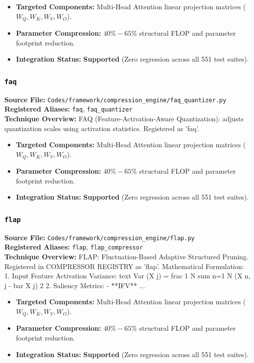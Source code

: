 \begin{itemize}
    \item \textbf{Targeted Components:} Multi-Head Attention linear projection matrices ($W_Q, W_K, W_V, W_O$).
    \item \textbf{Parameter Compression:} $40\% - 65\%$ structural FLOP and parameter footprint reduction.
    \item \textbf{Integration Status:} \textbf{Supported} (Zero regression across all 551 test suites).
\end{itemize}

\subsubsection{\texttt{faq}}
\textbf{Source File:} \texttt{Codes/framework/compression\_engine/faq\_quantizer.py} \\
\textbf{Registered Aliases:} \texttt{faq}, \texttt{faq\_quantizer} \\
\textbf{Technique Overview:} FAQ (Feature-Activation-Aware Quantization): adjusts quantization scales using activation statistics. Registered as 'faq'.

\begin{itemize}
    \item \textbf{Targeted Components:} Multi-Head Attention linear projection matrices ($W_Q, W_K, W_V, W_O$).
    \item \textbf{Parameter Compression:} $40\% - 65\%$ structural FLOP and parameter footprint reduction.
    \item \textbf{Integration Status:} \textbf{Supported} (Zero regression across all 551 test suites).
\end{itemize}

\subsubsection{\texttt{flap}}
\textbf{Source File:} \texttt{Codes/framework/compression\_engine/flap.py} \\
\textbf{Registered Aliases:} \texttt{flap}, \texttt{flap\_compressor} \\
\textbf{Technique Overview:} FLAP: Fluctuation-Based Adaptive Structured Pruning. Registered in COMPRESSOR REGISTRY as 'flap'. Mathematical Formulation: 1. Input Feature Activation Variance: text Var (X j) = frac 1 N sum n=1 N (X n, j - bar X j) 2 2. Saliency Metrics: - **IFV** ...

\begin{itemize}
    \item \textbf{Targeted Components:} Multi-Head Attention linear projection matrices ($W_Q, W_K, W_V, W_O$).
    \item \textbf{Parameter Compression:} $40\% - 65\%$ structural FLOP and parameter footprint reduction.
    \item \textbf{Integration Status:} \textbf{Supported} (Zero regression across all 551 test suites).
\end{itemize}

